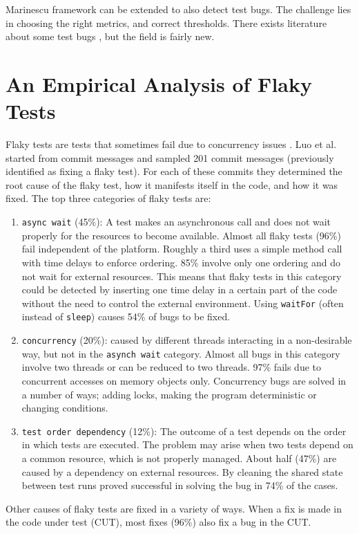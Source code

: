 \documentclass{uvamscse}
\newcommand{\Aflaky}{Luo et al.}
\begin{document}
Marinescu framework can be extended to also detect test bugs. The challenge lies in choosing the right metrics, and correct thresholds. There exists literature about some test bugs \cite{greiler2013automated, hao2013bug, herzig2015empirically, luo2014empirical}, but the field is fairly new. 

\section{An Empirical Analysis of Flaky Tests}
Flaky tests are tests that sometimes fail due to concurrency issues \cite{luo2014empirical}. \Aflaky{} started from commit messages and sampled 201 commit messages (previously identified as fixing a flaky test). For each of these commits they determined the root cause of the flaky test, how it manifests itself in the code, and how it was fixed. The top three categories of flaky tests are:
\begin{enumerate}
	\item \texttt{async wait} (45\%): A test makes an asynchronous call and does not wait properly for the resources to become available. Almost all flaky tests (96\%) fail independent of the platform. Roughly a third uses a simple method call with time delays to enforce ordering. 85\% involve only one ordering and do not wait for external resources. This means that flaky tests in this category could be detected by inserting one time delay in a certain part of the code without the need to control the external environment. Using \texttt{waitFor} (often instead of \texttt{sleep}) causes 54\% of bugs to be fixed. 
	\item \texttt{concurrency} (20\%): caused by different threads interacting in a non-desirable way, but not in the \texttt{asynch wait} category. Almost all bugs in this category involve two threads or can be reduced to two threads. 97\% fails due to concurrent accesses on memory objects only. Concurrency bugs are solved in a number of ways; adding locks, making the program deterministic or changing conditions. 
	\item \texttt{test order dependency} (12\%): The outcome of a test depends on the order in which tests are executed. The problem may arise when two tests depend on a common resource, which is not properly managed. About half (47\%) are caused by a dependency on external resources. By cleaning the shared state between test runs proved successful in solving the bug in 74\% of the cases. 
\end{enumerate}
Other causes of flaky tests are fixed in a variety of ways. When a fix is made in the code under test (CUT), most fixes (96\%) also fix a bug in the CUT.
\end{document}
